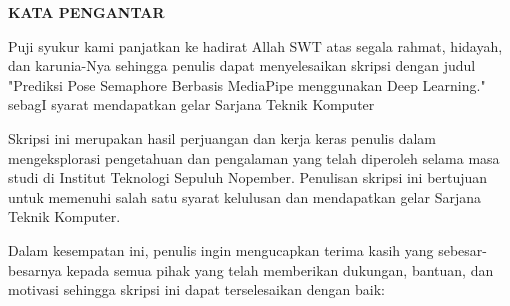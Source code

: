 \begin{center}
    \Large
    \textbf{KATA PENGANTAR}
  \end{center}
  
  
  \vspace{2ex}
  
  
  Puji syukur kami panjatkan ke hadirat Allah SWT atas segala rahmat, hidayah, dan karunia-Nya sehingga penulis dapat menyelesaikan skripsi dengan judul "Prediksi Pose Semaphore Berbasis MediaPipe menggunakan Deep Learning." sebagI syarat mendapatkan gelar Sarjana Teknik Komputer

  Skripsi ini merupakan hasil perjuangan dan kerja keras penulis dalam mengeksplorasi pengetahuan dan pengalaman yang telah diperoleh selama masa studi di Institut Teknologi Sepuluh Nopember. Penulisan skripsi ini bertujuan untuk memenuhi salah satu syarat kelulusan dan mendapatkan gelar Sarjana Teknik Komputer.

  Dalam kesempatan ini, penulis ingin mengucapkan terima kasih yang sebesar-besarnya kepada semua pihak yang telah memberikan dukungan, bantuan, dan motivasi sehingga skripsi ini dapat terselesaikan dengan baik:
  
